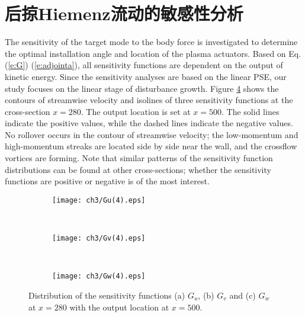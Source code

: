 \section{后掠Hiemenz流动的敏感性分析}
The sensitivity of the target mode to the body force is investigated to determine the optimal installation angle and location of the plasma actuators. Based on Eq.(\ref{e:G}) (\ref{e:adjointa}), all sensitivity functions are dependent on the output of kinetic energy. Since the sensitivity analyses are based on the linear PSE, our study focuses on the linear stage of disturbance growth. Figure \ref{f:Guvw1} shows the contours of streamwise velocity and isolines of three sensitivity functions at the cross-section $x =280$. The output location is set at $x =500$. The solid lines indicate the positive values, while the dashed lines indicate the negative values. No rollover occurs in the contour of streamwise velocity; the low-momentum and high-momentum streaks are located side by side near the wall, and the crossflow vortices are forming. Note that similar patterns of the sensitivity function distributions can be found at other cross-sections; whether the sensitivity functions are positive or negative is of the most interest.
\begin{figure}
  \centering
  \begin{subfigure}{\textwidth}
  \texttt{[image: ch3/Gu(4).eps]}
  \caption{\label{f:Gu1}}
  \end{subfigure}\\
  \bigskip
  \begin{subfigure}{\textwidth}
  \texttt{[image: ch3/Gv(4).eps]}
  \caption{\label{f:Gv1}}
  \end{subfigure}\\
  \bigskip
  \begin{subfigure}{\textwidth}
  \texttt{[image: ch3/Gw(4).eps]}
  \caption{\label{f:Gw1}}
  \end{subfigure}
  \caption{Distribution of the sensitivity functions (a) $G_u$, (b) $G_v$ and (c) $G_w$ at $x =280$ with the output location at $x =500$.}\label{f:Guvw1}
\end{figure}

